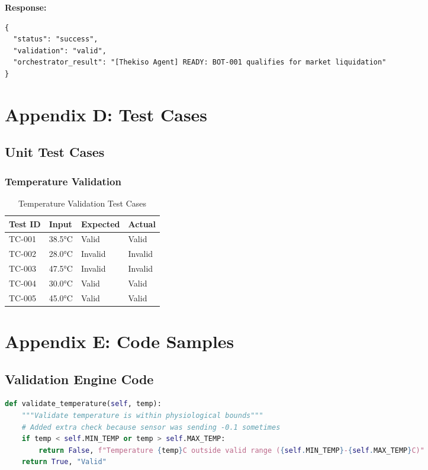\textbf{Response:}
\begin{verbatim}
{
  "status": "success",
  "validation": "valid",
  "orchestrator_result": "[Thekiso Agent] READY: BOT-001 qualifies for market liquidation"
}
\end{verbatim}

\section*{Appendix D: Test Cases}

\subsection*{Unit Test Cases}

\subsubsection*{Temperature Validation}

\begin{table}[H]
\centering
\begin{tabular}{|l|l|l|l|}
\hline
\textbf{Test ID} & \textbf{Input} & \textbf{Expected} & \textbf{Actual} \\
\hline
TC-001 & 38.5°C & Valid & Valid \\
TC-002 & 28.0°C & Invalid & Invalid \\
TC-003 & 47.5°C & Invalid & Invalid \\
TC-004 & 30.0°C & Valid & Valid \\
TC-005 & 45.0°C & Valid & Valid \\
\hline
\end{tabular}
\caption{Temperature Validation Test Cases}
\end{table}

\section*{Appendix E: Code Samples}

\subsection*{Validation Engine Code}

\begin{lstlisting}[language=Python, caption=Temperature Validation]
def validate_temperature(self, temp):
    """Validate temperature is within physiological bounds"""
    # Added extra check because sensor was sending -0.1 sometimes
    if temp < self.MIN_TEMP or temp > self.MAX_TEMP:
        return False, f"Temperature {temp}C outside valid range ({self.MIN_TEMP}-{self.MAX_TEMP}C)"
    return True, "Valid"
\end{lstlisting}

